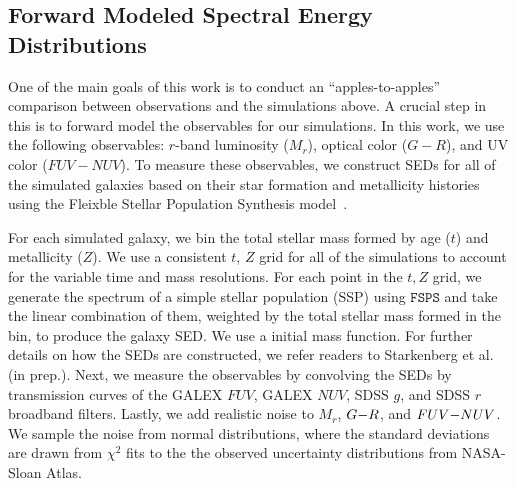 \subsection{Forward Modeled Spectral Energy Distributions} \label{sec:fm} 
One of the main goals of this work is to conduct an ``apples-to-apples'' comparison
between observations and the simulations above. A crucial step in this is to
forward model the observables for our simulations. In this work, we use the
following observables: $r$-band luminosity ($M_r$), optical color ($G-R$), and 
UV color ($FUV-NUV$). To measure these observables, we construct SEDs for all
of the simulated galaxies based on their star formation and metallicity histories
using the Fleixble Stellar Population Synthesis model~\citep[$\mathtt{FSPS}$;][]{conroy2009, conroy2010}. 

For each simulated galaxy, we bin the total stellar mass formed by age ($t$)
and metallicity ($Z$). We use a consistent $t$, $Z$ grid for all of the simulations
to account for the variable time and mass resolutions. For each point in the
$t, Z$ grid, we generate the spectrum of a simple stellar population (SSP)
using $\mathtt{FSPS}$ and take the linear combination of them, weighted by 
the total stellar mass formed in the bin, to produce the galaxy SED. We use a
\cite{chabrier2003} initial mass function. For further
details on how the SEDs are constructed, we refer readers to Starkenberg et al.
(in prep.). Next, we measure the observables by convolving the SEDs by
transmission curves of the GALEX $FUV$, GALEX $NUV$, SDSS $g$, and SDSS $r$
broadband filters. Lastly, we add realistic noise to $M_r$, $G{-}R$, and $FUV{-}NUV$. 
We sample the noise from normal distributions, where the standard deviations 
are drawn from $\chi^2$ fits to the the observed uncertainty distributions from 
NASA-Sloan Atlas.

